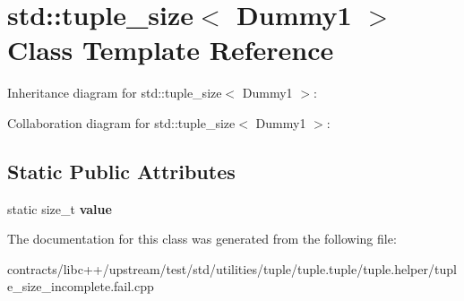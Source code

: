 \hypertarget{classstd_1_1tuple__size_3_01_dummy1_01_4}{}\section{std\+:\+:tuple\+\_\+size$<$ Dummy1 $>$ Class Template Reference}
\label{classstd_1_1tuple__size_3_01_dummy1_01_4}


Inheritance diagram for std\+:\+:tuple\+\_\+size$<$ Dummy1 $>$\+:


Collaboration diagram for std\+:\+:tuple\+\_\+size$<$ Dummy1 $>$\+:
\subsection*{Static Public Attributes}
\begin{DoxyCompactItemize}
\item 
\mbox{\label{classstd_1_1tuple__size_3_01_dummy1_01_4_ade12c6399c119b2cdd852475eaa3065e}} 
static size\+\_\+t {\bfseries value}
\end{DoxyCompactItemize}


The documentation for this class was generated from the following file\+:\begin{DoxyCompactItemize}
\item 
contracts/libc++/upstream/test/std/utilities/tuple/tuple.\+tuple/tuple.\+helper/tuple\+\_\+size\+\_\+incomplete.\+fail.\+cpp\end{DoxyCompactItemize}
